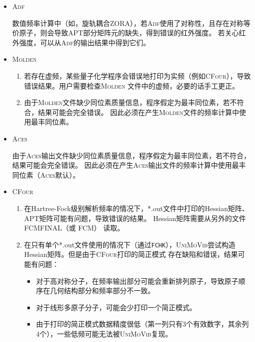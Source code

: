 \documentclass[12pt,a4paper,openany,twoside,cap,UTF8]{ctexbook}
\begin{document}
\begin{itemize}
\item \textsc{Adf}

数值频率计算中（如，旋轨耦合ZORA），若\textsc{Adf}使用了对称性，且存在对称等价原子，则会导致APT部分矩阵元的缺失，得到错误的红外强度。
若关心红外强度，可以从\textsc{Adf}的输出结果中得到它们。

\item \textsc{Molden}

\begin{enumerate}
\item 若存在虚频，某些量子化学程序会错误地打印为实频（例如\textsc{CFour}），导致错误结果。用户需要检查\textsc{Molden}
文件中的虚频，必要的话手工更正。

\item 由于\textsc{Molden}文件缺少同位素质量信息，程序假定为最丰同位素，若不符合，结果可能会完全错误。
因此必须在产生\textsc{Molden}文件的频率计算中使用最丰同位素。
\end{enumerate}

\item \textsc{Aces}

由于\textsc{Aces}输出文件缺少同位素质量信息，程序假定为最丰同位素，若不符合，结果可能会完全错误。
因此必须在产生\textsc{Aces}输出文件的频率计算中使用最丰同位素（\textsc{Aces}默认）。

\item \textsc{CFour}

\begin{enumerate}
\item 在Hartree-Fock级别解析频率的情况下，*.out文件中打印的Hessian矩阵、APT矩阵可能有问题，导致错误的结果。
  Hessian矩阵需要从另外的文件 FCMFINAL（或 FCM） 读取。

\item 在只有单个*.out文件使用的情况下（通过\verb|FCHK|），\textsc{UniMoVib}尝试构造Hessian矩阵。但是由于\textsc{CFour}打印的简正模式
存在缺陷和错误，结果可能有问题：
  \begin{itemize}
    \item[(a)] 对于高对称分子，在频率输出部分可能会重新排列原子，导致原子顺序在几何结构部分和频率部分不一致。
    \item[(b)] 对于线形多原子分子，可能会少打印一个简正模式。
    \item[(c)] 由于打印的简正模式数据精度很低（第一列只有3个有效数字，其余列4个），一些低频可能无法被\textsc{UniMoVib}复现。
  \end{itemize}
\end{enumerate}

\end{itemize}
\end{document}
